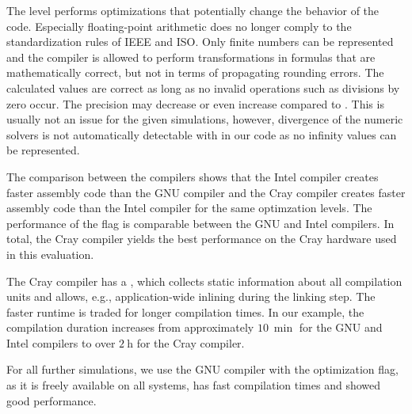 The  level performs optimizations that potentially change the behavior of the code. 
Especially floating-point arithmetic does no longer comply to the standardization rules of IEEE and ISO. Only finite numbers can be represented and the compiler is allowed to perform transformations in formulas that are mathematically correct, but not in terms of propagating rounding errors. The calculated values are correct as long as no invalid operations such as divisions by zero occur. The precision may decrease or even increase compared to . This is usually not an issue for the given simulations, however, divergence of the numeric solvers is not automatically detectable with  in our code as no infinity values can be represented.

The comparison between the compilers shows that the Intel compiler creates faster assembly code than the GNU compiler and the Cray compiler creates faster assembly code than the Intel compiler for the same optimzation levels. The performance of the  flag is comparable between the GNU and Intel compilers. In total, the Cray compiler yields the best performance on the Cray hardware used in this evaluation. 

The Cray compiler has a , which collects static information about all compilation units and allows, e.g., application-wide inlining during the linking step. The faster runtime is traded for longer compilation times. In our example, the compilation duration increases from approximately $\SI{10}{\min}$ for the GNU and Intel compilers to over $\SI{2}{\hour}$ for the Cray compiler.

For all further simulations, we use the GNU compiler with the  optimization flag, as it is freely available on all systems, has fast compilation times and showed good performance.

